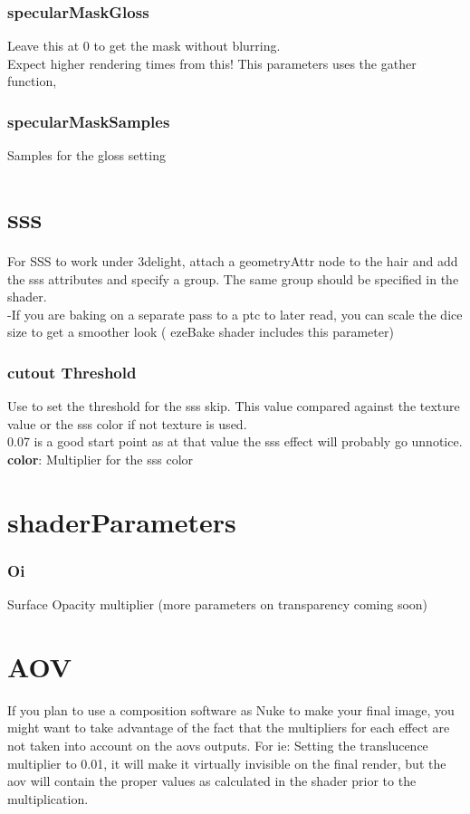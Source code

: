\documentclass[final,letterpaper,twoside,12pt]{report}
\begin{document}
\subsubsection {specularMaskGloss}
Leave this at 0 to get the mask without blurring. \\
Expect higher rendering times from this! This parameters uses the gather function, 
\subsubsection {specularMaskSamples}
Samples for the gloss setting


\section {sss}
For SSS to work under 3delight, attach a geometryAttr node to the hair and add the sss attributes and specify a group. The same group should be specified in the shader.\\

-If you are baking on a separate pass to a ptc to later read, you can scale the dice size to get a smoother look ( ezeBake shader includes this parameter) 
\subsubsection {cutout Threshold}
Use to set the threshold for the sss skip. This value compared against the texture value or the sss color if not texture is used. \\
0.07 is a good start point as at that value the sss effect will probably go unnotice.\\
\textbf{color}: Multiplier for the sss color

\section {shaderParameters}
\subsubsection {Oi}
Surface Opacity multiplier (more parameters on transparency coming soon)
\smallskip

\section {AOV}
If you plan to use a composition software as Nuke to make your final image, you might want to take advantage of the fact that the multipliers for each effect are not taken into account on the aovs outputs.
For ie: Setting the translucence multiplier to 0.01, it will make it virtually invisible on the final render, but the aov will contain the proper values as calculated in the shader prior to the multiplication.
\end{document}
